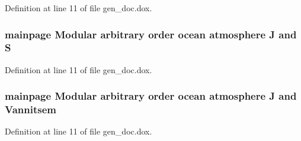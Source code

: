 Definition at line 11 of file gen\-\_\-doc.\-dox.

\hypertarget{gen__doc_8dox_ad6615f0ea32be50cff16a93bb5228d22}{
\subsubsection[{S}]{\setlength{\rightskip}{0pt plus 5cm}mainpage Modular arbitrary order ocean atmosphere J and S}}\label{gen__doc_8dox_ad6615f0ea32be50cff16a93bb5228d22}


Definition at line 11 of file gen\-\_\-doc.\-dox.

\hypertarget{gen__doc_8dox_a45b01a572421d9a881db9eb486a6ac2d}{
\subsubsection[{Vannitsem}]{\setlength{\rightskip}{0pt plus 5cm}mainpage Modular arbitrary order ocean atmosphere J and Vannitsem}}\label{gen__doc_8dox_a45b01a572421d9a881db9eb486a6ac2d}


Definition at line 11 of file gen\-\_\-doc.\-dox.

